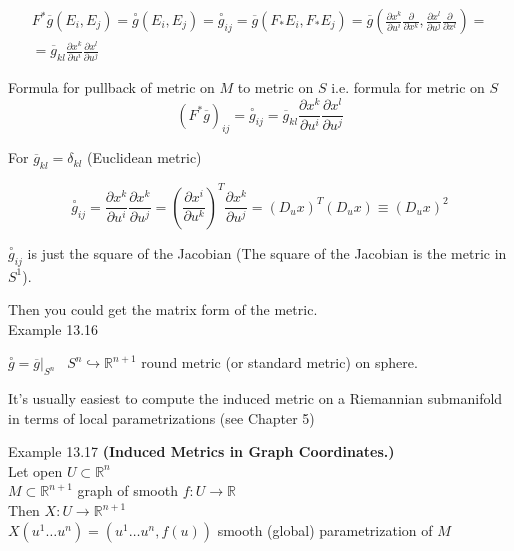 \[
\begin{gathered}
  F^*\overline{g}(E_i,E_j) = \overset{\circ}{g}(E_i, E_j) = \overset{\circ}{g}_{ij} = \overline{g}(F_* E_i, F_* E_j) = \overline{g}{ \left( \frac{ \partial x^k}{ \partial u^i } \frac{ \partial }{ \partial x^k} , \frac{ \partial x^l }{ \partial u^j } \frac{ \partial }{ \partial x^l } \right) } = \\
  = \overline{g}_{kl} \frac{ \partial x^k}{ \partial u^i } \frac{ \partial x^l }{ \partial u^j }
\end{gathered}
\]

Formula for pullback of metric on $M$ to metric on $S$ i.e. formula for metric on $S$
\[
\boxed{ (F^* \overline{g} )_{ij} = \overset{\circ}{g}_{ij} = \overline{g}_{kl} \frac{ \partial x^k}{ \partial u^i } \frac{ \partial x^l }{ \partial u^j } }
\]

For $\overline{g}_{kl} = \delta_{kl}$ (Euclidean metric)

\[
\overset{\circ}{g}_{ij} = \frac{ \partial x^k}{ \partial u^i } \frac{ \partial x^k}{ \partial u^j } = \left( \frac{ \partial x^i }{ \partial u^k } \right)^T \frac{ \partial x^k}{ \partial u^j } = (D_u x)^T (D_u x) \equiv (D_u x)^2 
\]

$\overset{\circ}{g}_{ij}$ is just the square of the Jacobian (The square of the Jacobian is the metric in $S^1$).  

Then you could get the matrix form of the metric.  \\






Example 13.16

$\overset{ \circ}{g} = \left. \overline{g} \right|_{S^n}$  \quad \, $S^n \hookrightarrow \mathbb{R}^{n+1}$ round metric (or standard metric) on sphere. 




It's usually easiest to compute the induced metric on a Riemannian submanifold in terms of local parametrizations (see Chapter 5)


Example 13.17 \textbf{(Induced Metrics in Graph Coordinates.)} \\
Let open $U \subset \mathbb{R}^n$ \\
\phantom{ Let open } $M \subset \mathbb{R}^{n+1}$ graph of smooth $f:U \to \mathbb{R}$ \\

Then $X:U\to \mathbb{R}^{n+1}$ \\
\phantom{ Then }$X(u^1 \dots u^n) = (u^1 \dots u^n, f(u))$ smooth (global) parametrization of $M$

